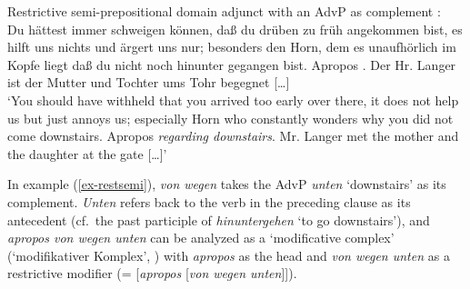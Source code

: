 \documentclass[output=paper
  ,nobabel
  ,draftmode
  ,babelshorthands
  ,colorlinks, citecolor=brown
]{langscibook}
\begin{document}
\ea\label{ex-restsemi} Restrictive semi-prepositional domain adjunct with an AdvP as complement \citep[120–121]{Goethe1767}:\\
\smallskip
Du hättest immer schweigen können, daß du drüben zu früh angekommen bist, es hilft uns nichts und ärgert uns nur; besonders den Horn, dem es unaufhörlich im Kopfe liegt daß du nicht noch hinunter gegangen bist. Apropos . Der Hr. Langer ist der Mutter und Tochter ums Tohr begegnet [\ldots] \\
	`You should have withheld that you arrived too early over there, it does not help us but just annoys us; especially Horn who constantly wonders why you did not come downstairs. Apropos \emph{regarding downstairs}. Mr. Langer met the mother and the daughter at the gate [\ldots]'
\z

\largerpage[-1]
\noindent
In example (\ref{ex-restsemi}), \emph{von wegen} takes the AdvP \emph{unten} `downstairs' as its complement. \emph{Unten} refers back to the verb in the preceding clause as its antecedent (cf.\ the past participle of \emph{hinuntergehen} `to go downstairs'), and \emph{apropos von wegen unten} can be analyzed as a `modificative complex' (`modifikativer Komplex', \citealp[1167–1172]{Zifonun1997})
with \emph{apropos} as the head and \emph{von wegen unten} as a restrictive modifier (= [\emph{apropos} [\emph{von wegen unten}]]).
\end{document}
